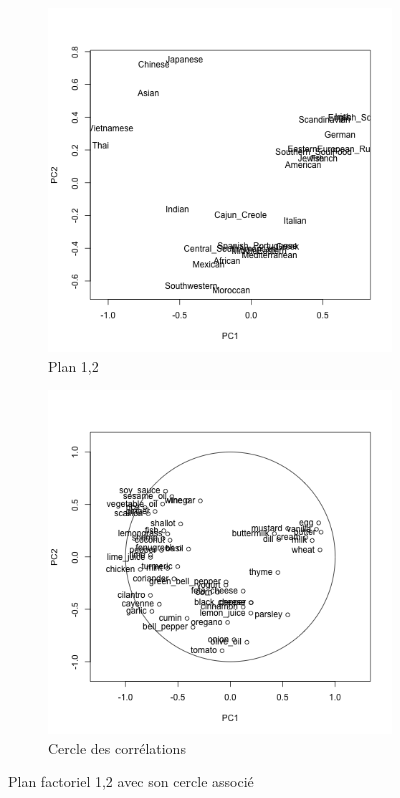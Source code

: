 \documentclass[a4paper,11pt,oneside,roman]{article}
\begin{document}
    \begin{figure}
        \centering
        \begin{subfigure}{.5\textwidth}
          \centering
          \includegraphics[width=.8\linewidth]{imgs/acp_plan_1_2.png}
          \caption{Plan 1,2}
          \label{fig:sub1}
        \end{subfigure}%
        \begin{subfigure}{.5\textwidth}
          \centering
          \includegraphics[width=.8\linewidth]{imgs/cercle_plan_1_2.png}
          \caption{Cercle des corrélations}
          \label{fig:sub2}
        \end{subfigure}
        \caption{Plan factoriel 1,2 avec son cercle associé}
        \label{fig_acp_plan_1_2}
    \end{figure}
\end{document}
